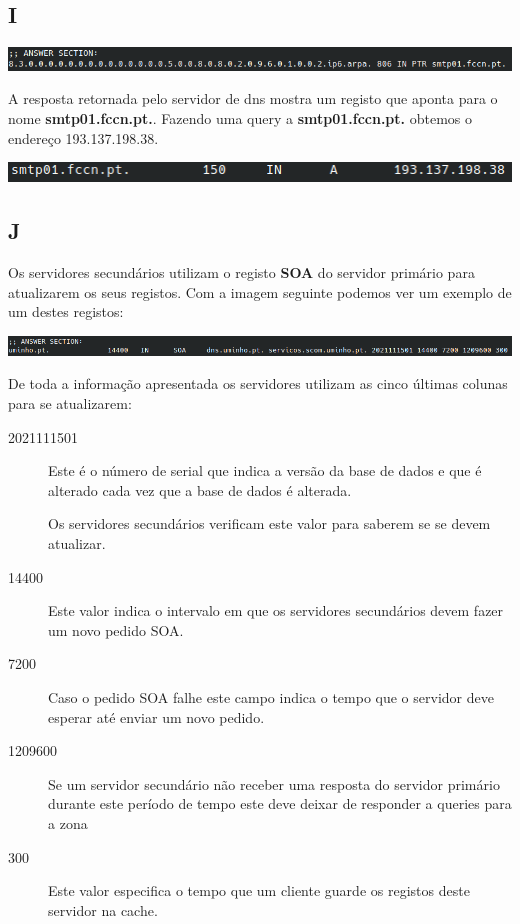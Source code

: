 \documentclass{report}
\begin{document}
        \subsection*{I}
            \noindent
            \includegraphics[width=\textwidth]{images/dig_ipv6.png}
            \par
            A resposta retornada pelo servidor de dns mostra um registo que aponta para o nome \textbf{smtp01.fccn.pt.}.
            Fazendo uma query a \textbf{smtp01.fccn.pt.} obtemos o endereço 193.137.198.38.
            \par
            \noindent
            \includegraphics[width=\textwidth]{images/dig_smtp01.png}
            \par
        \subsection*{J}
            Os servidores secundários utilizam o registo \textbf{SOA} do servidor primário para atualizarem os seus registos. 
            Com a imagem seguinte podemos ver um exemplo de um destes registos: 
            \vspace{0.45em}
            \par
            \noindent
            \includegraphics[width=\textwidth]{images/uminho_soa.png}
            \par
            \vspace{0.45em}
            De toda a informação apresentada os servidores utilizam as cinco últimas colunas para se atualizarem:
            \begin{description}
                \item[2021111501] Este é o número de serial que indica a versão da base de dados e que é alterado cada vez que a base de dados é alterada. 
                \par Os servidores secundários verificam este valor para saberem se se devem atualizar.
                \item[14400] Este valor indica o intervalo em que os servidores secundários devem fazer um novo pedido SOA.
                \item[7200] Caso o pedido SOA falhe este campo indica o tempo que o servidor deve esperar até enviar um novo pedido.
                \item[1209600] Se um servidor secundário não receber uma resposta do servidor primário durante este período de tempo este deve deixar de responder a queries para a zona
                \item[300] Este valor especifica o tempo que um cliente guarde os registos deste servidor na cache. 
            \end{description}
\end{document}

